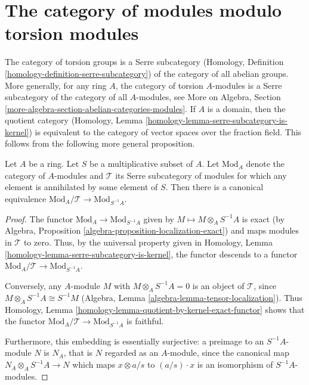 \section{The category of modules modulo torsion modules}
\label{section-serre-quotient-modulo-torsion-modules}

\noindent
The category of torsion groups is a Serre subcategory
(Homology, Definition \ref{homology-definition-serre-subcategory})
of the category of all abelian groups. More generally, for any ring $A$,
the category of torsion $A$-modules is a Serre subcategory of the
category of all $A$-modules, see
More on Algebra, Section \ref{more-algebra-section-abelian-categories-modules}.
If $A$ is a domain, then the quotient category
(Homology, Lemma \ref{homology-lemma-serre-subcategory-is-kernel})
is equivalent to the category of vector spaces over the fraction field.
This follows from the following more general proposition.

\begin{proposition}
\label{proposition-localization-and-serre-quotients}
Let $A$ be a ring. Let $S$ be a multiplicative subset of $A$.
Let $\text{Mod}_A$ denote the category of $A$-modules and $\mathcal{T}$ its
Serre subcategory of modules for which any element is annihilated by some
element of $S$. Then there is a canonical equivalence
$\text{Mod}_A/\mathcal{T} \rightarrow \text{Mod}_{S^{-1}A}$.
\end{proposition}

\begin{proof}
The functor $\text{Mod}_A \to \text{Mod}_{S^{-1}A}$ given by $M
\mapsto M \otimes_A S^{-1}A$ is exact (by Algebra, Proposition
\ref{algebra-proposition-localization-exact})
and maps modules in $\mathcal{T}$ to zero.
Thus, by the universal property given in Homology, Lemma
\ref{homology-lemma-serre-subcategory-is-kernel}, the functor descends to a
functor $\text{Mod}_A/\mathcal{T} \to \text{Mod}_{S^{-1}A}$.

\medskip\noindent
Conversely, any $A$-module $M$ with $M \otimes_A S^{-1}A = 0$
is an object of $\mathcal{T}$, since
$M \otimes_A S^{-1}A \cong S^{-1} M$
(Algebra, Lemma \ref{algebra-lemma-tensor-localization}). Thus
Homology, Lemma \ref{homology-lemma-quotient-by-kernel-exact-functor}
shows that the functor
$\text{Mod}_A/\mathcal{T} \to \text{Mod}_{S^{-1}A}$ is faithful.

\medskip\noindent
Furthermore, this embedding is essentially surjective: a preimage to an
$S^{-1}A$-module $N$ is $N_A$, that is $N$ regarded as an $A$-module, since the
canonical map $N_A \otimes_A S^{-1}A \to N$ which maps $x \otimes a/s$ to
$(a/s) \cdot x$ is an isomorphism of $S^{-1}A$-modules.
\end{proof}

